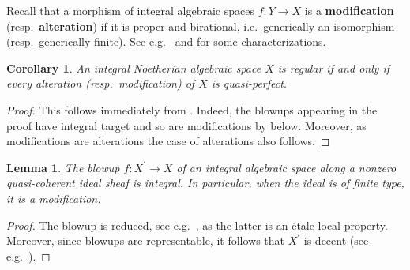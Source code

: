 \documentclass[11pt]{amsart}
\theoremstyle{plain}
\newtheorem{lemma}[theorem]{Lemma}
\newtheorem{corollary}[theorem]{Corollary}
\theoremstyle{definition}
\numberwithin{equation}{section}
\numberwithin{theorem}{section}
\begin{document}
\begin{appendix}
Recall that a morphism of integral algebraic spaces $f\colon Y \to X$ is a \textbf{modification} (resp.\ \textbf{alteration}) if it is proper and birational, i.e.\ generically an isomorphism (resp.\ generically finite).
See e.g.\ \cite[\href{https://stacks.math.columbia.edu/tag/0ACU}{Tag 0ACU}]{StacksProject} and \cite[\href{https://stacks.math.columbia.edu/tag/0AD7}{Tag 0AD7}]{StacksProject} for some characterizations.

\begin{corollary}
    \label{cor:regularity_via_alteration}
    An integral Noetherian algebraic space $X$ is regular if and only if every alteration (resp.\ modification) of $X$ is quasi-perfect.
\end{corollary}

\begin{proof}
    This follows immediately from . Indeed, the blowups appearing in the proof have integral target and so are modifications by  below.
    Moreover, as modifications are alterations the case of alterations also follows.
\end{proof}

\begin{lemma}
    \label{lem:blowup_integral_spaces}
    The blowup $f\colon X^\prime \to X$ of an integral algebraic space along a nonzero quasi-coherent ideal sheaf is integral. 
    In particular, when the ideal is of finite type, it is a modification.
\end{lemma}

\begin{proof}
    The blowup is reduced, see e.g.\ \cite[\href{https://stacks.math.columbia.edu/tag/085W}{Tag 085W}]{StacksProject}, as the latter is an \'{e}tale local property.
    Moreover, since blowups are representable, 
    it follows that $X^\prime$ is decent (see e.g.\ \cite[\href{https://stacks.math.columbia.edu/tag/0ABT}{Tag 0ABT}]{StacksProject}). 
    

\end{proof}
\end{appendix}
\end{document}
